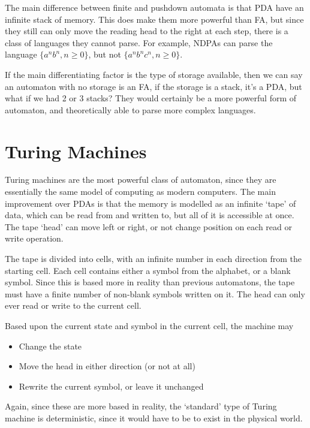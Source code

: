 
The main difference between finite and pushdown automata is that PDA have an infinite stack of memory. This does make
 them more powerful than FA, but since they still can only move the reading head to the right at each step, there is a
 class of languages they cannot parse. For example, NDPAs can parse the language $\{{a^n}{b^n}, n \geq 0\}$, but not
 $\{{a^n}{b^n}{c^n}, n \geq 0\}$.

If the main differentiating factor is the type of storage available, then we can say an automaton with no storage is an
 FA, if the storage is a stack, it's a PDA, but what if we had 2 or 3 stacks? They would certainly be a more powerful
 form of automaton, and theoretically able to parse more complex languages.

\section*{Turing Machines}

Turing machines are the most powerful class of automaton, since they are essentially the same model of computing as
 modern computers. The main improvement over PDAs is that the memory is modelled as an infinite `tape' of data, which
 can be read from and written to, but all of it is accessible at once. The tape `head' can move left or right, or not
 change position on each read or write operation.

The tape is divided into cells, with an infinite number in each direction from the starting cell. Each cell contains
 either a symbol from the alphabet, or a blank symbol. Since this is based more in reality than previous automatons,
 the tape must have a finite number of non-blank symbols written on it. The head can only ever read or write to the
 current cell.

Based upon the current state and symbol in the current cell, the machine may
\begin{itemize}
  \item Change the state
  \item Move the head in either direction (or not at all)
  \item Rewrite the current symbol, or leave it unchanged
\end{itemize}

Again, since these are more based in reality, the `standard' type of Turing machine is deterministic, since it would
 have to be to exist in the physical world.

